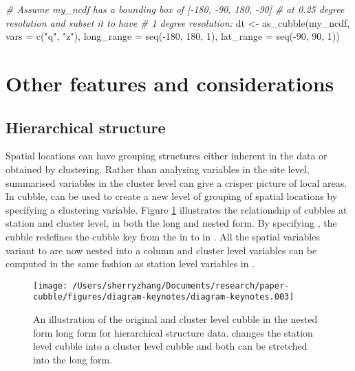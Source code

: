 \documentclass{article}
\newenvironment{Shaded}{\begin{snugshade}}{\end{snugshade}}
\newcommand{\AttributeTok}[1]{\textcolor[rgb]{0.77,0.63,0.00}{#1}}
\newcommand{\CommentTok}[1]{\textcolor[rgb]{0.56,0.35,0.01}{\textit{#1}}}
\newcommand{\DecValTok}[1]{\textcolor[rgb]{0.00,0.00,0.81}{#1}}
\newcommand{\FunctionTok}[1]{\textcolor[rgb]{0.00,0.00,0.00}{#1}}
\newcommand{\NormalTok}[1]{#1}
\newcommand{\OtherTok}[1]{\textcolor[rgb]{0.56,0.35,0.01}{#1}}
\newcommand{\SpecialCharTok}[1]{\textcolor[rgb]{0.00,0.00,0.00}{#1}}
\newcommand{\StringTok}[1]{\textcolor[rgb]{0.31,0.60,0.02}{#1}}
\begin{document}
\begin{Shaded}
\begin{Highlighting}[]
\CommentTok{\# Assume my\_ncdf has a bounding box of [{-}180, {-}90, 180, {-}90]}
\CommentTok{\# at 0.25 degree resolution and subset it to have}
\CommentTok{\# 1 degree resolution:}
\NormalTok{dt }\OtherTok{\textless{}{-}} \FunctionTok{as\_cubble}\NormalTok{(my\_ncdf, }\AttributeTok{vars =} \FunctionTok{c}\NormalTok{(}\StringTok{"q"}\NormalTok{, }\StringTok{"z"}\NormalTok{),}
                \AttributeTok{long\_range =} \FunctionTok{seq}\NormalTok{(}\SpecialCharTok{{-}}\DecValTok{180}\NormalTok{, }\DecValTok{180}\NormalTok{, }\DecValTok{1}\NormalTok{),}
                \AttributeTok{lat\_range =} \FunctionTok{seq}\NormalTok{(}\SpecialCharTok{{-}}\DecValTok{90}\NormalTok{, }\DecValTok{90}\NormalTok{, }\DecValTok{1}\NormalTok{))}
\end{Highlighting}
\end{Shaded}

\hypertarget{others}{%
\section{Other features and considerations}\label{others}}

\hypertarget{hierarchical-structure}{%
\subsection{Hierarchical structure}\label{hierarchical-structure}}

Spatial locations can have grouping structures either inherent in the data or obtained by clustering. Rather than analysing variables in the site level, summarised variables in the cluster level can give a crisper picture of local areas. In cubble,  can be used to create a new level of grouping of spatial locations by specifying a clustering variable. Figure \ref{fig:illu-hier} illustrates the relationship of cubbles at station and cluster level, in both the long and nested form. By specifying , the cubble redefines the cubble key from the  in  to  in . All the spatial variables variant to  are now nested into a  column and cluster level variables can be computed in the same fashion as station level variables in .

\begin{figure}

{\centering \texttt{[image: /Users/sherryzhang/Documents/research/paper-cubble/figures/diagram-keynotes/diagram-keynotes.003]} 

}

\caption{An illustration of the original and cluster level cubble in the nested form long form for hierarchical structure data.  changes the station level cubble into a cluster level cubble and both can be stretched into the long form.}\label{fig:illu-hier}
\end{figure}
\end{document}
